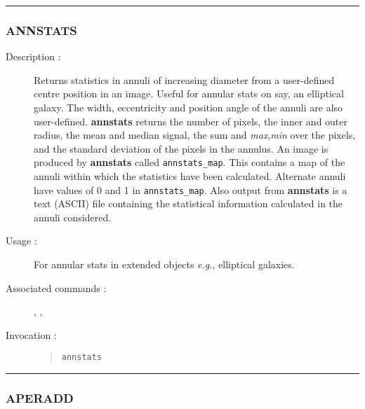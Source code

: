 \hrule
\subsubsection*{\label{ANNSTATS}ANNSTATS}

\begin{description}

\item[Description :] Returns statistics in annuli of increasing
diameter from a user-defined centre position in an image.  Useful for
annular stats on say, an elliptical galaxy.  The width, eccentricity
and position angle of the annuli are also user-defined.  {\bf annstats}
returns the number of pixels, the inner and outer radius, the mean and
median signal, the sum and {\it max},{\it min} over the pixels, and the
standard deviation of the pixels in the annulus. An image is produced
by {\bf annstats} called {\tt annstats\_map}.  This contains a map of
the annuli within which the statistics have been calculated. Alternate
annuli have values of 0 and 1 in {\tt annstats\_map}. Also output from
{\bf annstats} is a text (ASCII) file containing the statistical
information calculated in the annuli considered.

\item[Usage :] For annular stats in extended objects \emph{e.g.},
elliptical galaxies.

\item[Associated commands :] {\tt {}},
{\tt {}}, {\tt {}}

\item[Invocation :]

\begin{quote}{\tt  annstats }\end{quote}

\end{description}

\hrule
\subsubsection*{\label{APERADD}APERADD}

